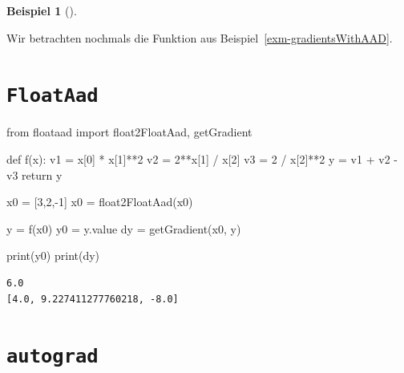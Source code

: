\documentclass[
  a4paper,
  DIV=11]{scrreprt}
\newenvironment{Shaded}{\begin{snugshade}}{\end{snugshade}}
\newcommand{\BuiltInTok}[1]{\textcolor[rgb]{0.00,0.23,0.31}{#1}}
\newcommand{\ControlFlowTok}[1]{\textcolor[rgb]{0.00,0.23,0.31}{#1}}
\newcommand{\DecValTok}[1]{\textcolor[rgb]{0.68,0.00,0.00}{#1}}
\newcommand{\ImportTok}[1]{\textcolor[rgb]{0.00,0.46,0.62}{#1}}
\newcommand{\KeywordTok}[1]{\textcolor[rgb]{0.00,0.23,0.31}{#1}}
\newcommand{\NormalTok}[1]{\textcolor[rgb]{0.00,0.23,0.31}{#1}}
\newcommand{\OperatorTok}[1]{\textcolor[rgb]{0.37,0.37,0.37}{#1}}
\theoremstyle{definition}
\theoremstyle{definition}
\newtheorem{example}{Beispiel}[chapter]
\theoremstyle{remark}
\begin{document}
\begin{example}[]\protect\hypertarget{exm-GradientPyTorchVsFloatAad}{}\label{exm-GradientPyTorchVsFloatAad}

Wir betrachten nochmals die Funktion aus
Beispiel~\ref{exm-gradientsWithAAD}.

\section{\texorpdfstring{\texttt{FloatAad}}{FloatAad}}

\begin{Shaded}
\begin{Highlighting}[]
\ImportTok{from}\NormalTok{ floataad }\ImportTok{import}\NormalTok{ float2FloatAad, getGradient}

\KeywordTok{def}\NormalTok{ f(x):}
\NormalTok{    v1 }\OperatorTok{=}\NormalTok{ x[}\DecValTok{0}\NormalTok{] }\OperatorTok{*}\NormalTok{ x[}\DecValTok{1}\NormalTok{]}\OperatorTok{**}\DecValTok{2}
\NormalTok{    v2 }\OperatorTok{=} \DecValTok{2}\OperatorTok{**}\NormalTok{x[}\DecValTok{1}\NormalTok{] }\OperatorTok{/}\NormalTok{ x[}\DecValTok{2}\NormalTok{]}
\NormalTok{    v3 }\OperatorTok{=} \DecValTok{2} \OperatorTok{/}\NormalTok{ x[}\DecValTok{2}\NormalTok{]}\OperatorTok{**}\DecValTok{2}
\NormalTok{    y }\OperatorTok{=}\NormalTok{ v1 }\OperatorTok{+}\NormalTok{ v2 }\OperatorTok{{-}}\NormalTok{ v3}
    \ControlFlowTok{return}\NormalTok{ y}

\NormalTok{x0 }\OperatorTok{=}\NormalTok{ [}\DecValTok{3}\NormalTok{,}\DecValTok{2}\NormalTok{,}\OperatorTok{{-}}\DecValTok{1}\NormalTok{]}
\NormalTok{x0 }\OperatorTok{=}\NormalTok{ float2FloatAad(x0)}

\NormalTok{y }\OperatorTok{=}\NormalTok{ f(x0)}
\NormalTok{y0 }\OperatorTok{=}\NormalTok{ y.value}
\NormalTok{dy }\OperatorTok{=}\NormalTok{ getGradient(x0, y)}

\BuiltInTok{print}\NormalTok{(y0)}
\BuiltInTok{print}\NormalTok{(dy)}
\end{Highlighting}
\end{Shaded}

\begin{verbatim}
6.0
[4.0, 9.227411277760218, -8.0]
\end{verbatim}

\section{\texorpdfstring{\texttt{autograd}}{autograd}}


\end{example}
\end{document}
